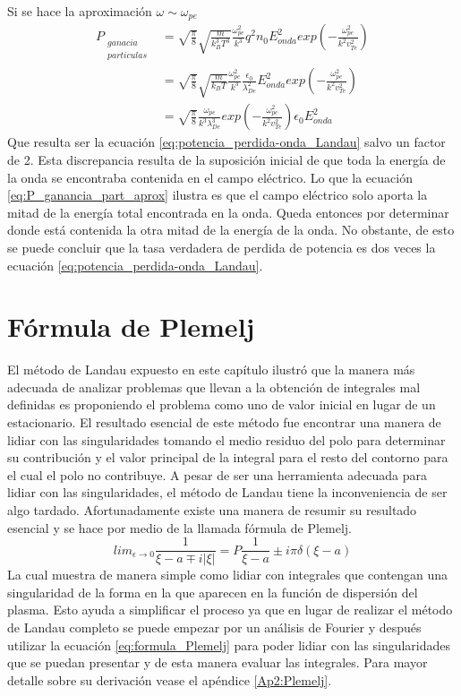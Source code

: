 \documentclass[../tesis_main_file.tex]{subfile}
\begin{document}
Si se hace la aproximación $\omega \sim \omega_{pe}$
\begin{equation}
\label{eq:P_ganancia_part_aprox}
\begin{split}
P_{\substack{ganacia\\particulas} } &= \sqrt{\frac{\pi}{8}}\sqrt{\frac{m}{k^3_BT^3}}\frac{\omega ^2_{pe}}{k^3}q^2n_0E^2_{onda}exp\left( -\frac{\omega ^2_{pe}}{k^2v^2_{Te}}\right)\\
&=\sqrt{\frac{\pi}{8}}\sqrt{\frac{m}{k_BT}}\frac{\omega ^2_{pe}}{k^3}\frac{\epsilon _0}{\lambda ^2_{De}}E^2_{onda}exp\left( -\frac{\omega ^2_{pe}}{k^2v^2_{Te}}\right)\\
&=\sqrt{\frac{\pi}{8}}\frac{\omega _{pe}}{k^3\lambda ^3_{De}}exp\left( -\frac{\omega ^2_{pe}}{k^2v^2_{Te}}\right) \epsilon _0 E^2_{onda}
\end{split}
\end{equation}
Que resulta ser la ecuación \ref{eq:potencia_perdida-onda_Landau} salvo un factor de 2. Esta discrepancia resulta de la suposición inicial de que toda la energía de la onda se encontraba contenida en el campo eléctrico. Lo que la ecuación \ref{eq:P_ganancia_part_aprox} ilustra es que el campo eléctrico solo aporta la mitad de la energía total encontrada en la onda. Queda entonces por determinar donde está contenida la otra mitad de la energía de la onda. No obstante, de esto se puede concluir que la tasa verdadera de perdida de potencia es dos veces la ecuación \ref{eq:potencia_perdida-onda_Landau}.
\section{Fórmula de Plemelj}
El método de Landau expuesto en este capítulo ilustró que la manera más adecuada de analizar problemas que llevan a la obtención de integrales mal definidas es proponiendo el problema como uno de valor inicial en lugar de un estacionario.
El resultado esencial de este método fue encontrar una manera de lidiar con las singularidades tomando el medio residuo del polo para determinar su contribución y el valor principal de la integral para el resto del contorno para el cual el polo no contribuye.
A pesar de ser una herramienta adecuada para lidiar con las singularidades, el método de Landau tiene la inconveniencia de ser algo tardado. Afortunadamente existe una manera de resumir su resultado esencial y se hace por medio de la llamada fórmula de Plemelj.
\begin{equation}
\label{eq:formula_Plemelj}
lim _{\epsilon \to 0}\frac{1}{\xi -a\mp i|\xi |}=P\frac{1}{\xi -a}\pm i\pi \delta (\xi -a)
\end{equation}
La cual muestra de manera simple como lidiar con integrales que contengan una singularidad de la forma en la que aparecen en la función de dispersión del plasma.
Esto ayuda a simplificar el proceso ya que en lugar de realizar el método de Landau completo se puede empezar por un análisis de Fourier y después utilizar la ecuación \ref{eq:formula_Plemelj} para poder lidiar con las singularidades que se puedan presentar y de esta manera evaluar las integrales.
Para mayor detalle sobre su derivación vease el apéndice \ref{Ap2:Plemelj}.
\end{document}

